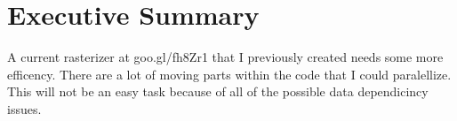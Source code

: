 \chapter*{Executive Summary}
A current rasterizer at goo.gl/fh8Zr1 that I previously created needs some more efficency. There are a lot of moving parts within the code that I could paralellize. This will not be an easy task because of all of the possible data dependicincy issues. 
